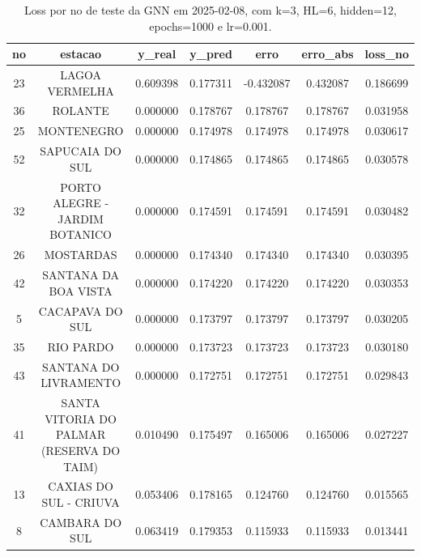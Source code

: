 \begin{table}[h]
\centering
\caption{Loss por no de teste da GNN em 2025-02-08, com k=3, HL=6, hidden=12, epochs=1000 e lr=0.001.}
\label{tab:gnn_loss_k3_hl6_h12_e1000_d20250208}
\begin{tabular}{ccccccc}
\toprule
no & estacao & y\_real & y\_pred & erro & erro\_abs & loss\_no \\
\midrule
23 & LAGOA VERMELHA & 0.609398 & 0.177311 & -0.432087 & 0.432087 & 0.186699 \\
36 & ROLANTE & 0.000000 & 0.178767 & 0.178767 & 0.178767 & 0.031958 \\
25 & MONTENEGRO & 0.000000 & 0.174978 & 0.174978 & 0.174978 & 0.030617 \\
52 & SAPUCAIA DO SUL & 0.000000 & 0.174865 & 0.174865 & 0.174865 & 0.030578 \\
32 & PORTO ALEGRE - JARDIM BOTANICO & 0.000000 & 0.174591 & 0.174591 & 0.174591 & 0.030482 \\
26 & MOSTARDAS & 0.000000 & 0.174340 & 0.174340 & 0.174340 & 0.030395 \\
42 & SANTANA DA BOA VISTA & 0.000000 & 0.174220 & 0.174220 & 0.174220 & 0.030353 \\
5 & CACAPAVA DO SUL & 0.000000 & 0.173797 & 0.173797 & 0.173797 & 0.030205 \\
35 & RIO PARDO & 0.000000 & 0.173723 & 0.173723 & 0.173723 & 0.030180 \\
43 & SANTANA DO LIVRAMENTO & 0.000000 & 0.172751 & 0.172751 & 0.172751 & 0.029843 \\
41 & SANTA VITORIA DO PALMAR (RESERVA DO TAIM) & 0.010490 & 0.175497 & 0.165006 & 0.165006 & 0.027227 \\
13 & CAXIAS DO SUL - CRIUVA & 0.053406 & 0.178165 & 0.124760 & 0.124760 & 0.015565 \\
8 & CAMBARA DO SUL & 0.063419 & 0.179353 & 0.115933 & 0.115933 & 0.013441 \\
\bottomrule
\end{tabular}
\end{table}
